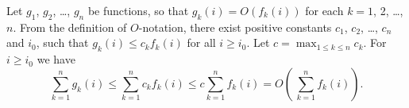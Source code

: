 \exercise
Let $g_1$, $g_2$, \dots, $g_n$ be functions, so that $g_k(i)=O(f_k(i))$ for each $k=1$, 2, \dots, $n$.
From the definition of $O$-notation, there exist positive constants $c_1$, $c_2$, \dots, $c_n$ and $i_0$, such that $g_k(i)\le c_k f_k(i)$ for all $i\ge i_0$.
Let $c=\max_{1\le k\le n}c_k$.
For $i\ge i_0$ we have
\[
    \sum_{k=1}^n g_k(i) \le \sum_{k=1}^n c_kf_k(i) \le c\sum_{k=1}^n f_k(i) = O\left(\,\sum_{k=1}^n f_k(i)\right).
\]
